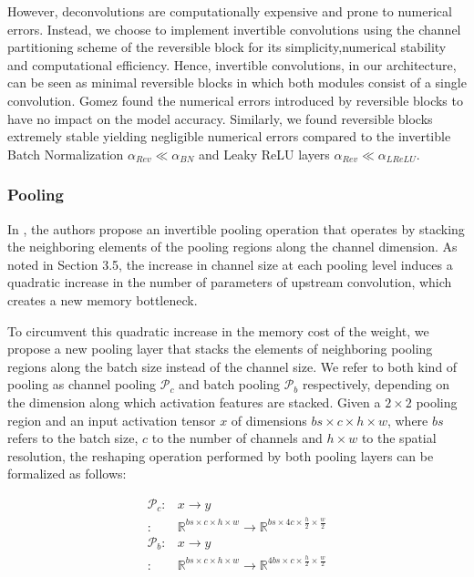 \documentclass[twocolumn]{bmcart}
\begin{document}
However, deconvolutions are computationally expensive and prone to numerical errors.
Instead, we choose to implement invertible convolutions using the channel partitioning scheme
of the reversible block for its simplicity,numerical stability and computational efficiency.
Hence, invertible convolutions, in our architecture, can be seen as minimal reversible blocks
in which both modules consist of a single convolution.
Gomez \etal \cite{gomez2017reversible} found the numerical errors introduced by reversible blocks to have no impact on the model accuracy.
Similarly, we found reversible blocks extremely stable yielding negligible numerical errors
compared to the invertible Batch Normalization $\alpha_{Rev} \ll \alpha_{BN}$
and Leaky ReLU layers $\alpha_{Rev} \ll \alpha_{LReLU}$.

\subsubsection{Pooling}

In \cite{jacobsen2018revnet}, the authors propose an invertible pooling operation that operates
by stacking the neighboring elements of the pooling regions along the channel dimension.
As noted in Section 3.5, the increase in channel size at each pooling level
induces a quadratic increase in the number of parameters of upstream convolution,
which creates a new memory bottleneck.

To circumvent this quadratic increase in the memory cost of the weight,
we propose a new pooling layer that stacks the elements of neighboring pooling regions along the batch size instead of the channel size.
We refer to both kind of pooling as channel pooling $\mathcal{P}_c$ and batch pooling $\mathcal{P}_b$ respectively,
depending on the dimension along which activation features are stacked.
Given a $2 \times 2$ pooling region and an input activation tensor $x$ of dimensions $bs \times c \times h \times w$,
where $bs$ refers to the batch size, $c$ to the number of channels and $h \times w$ to the spatial resolution,
the reshaping operation performed by both pooling layers can be formalized as follows:

\begin{subequations}
\begin{align}
	\mathcal{P}_c :& x \rightarrow y \\
	              :&  \mathbb{R}^{bs \times c \times h \times w}  \rightarrow \mathbb{R}^{bs \times 4c \times \frac{h}{2} \times \frac{w}{2}}\\
	\mathcal{P}_b :& x \rightarrow y \\
                      :&  \mathbb{R}^{bs \times c \times h \times w}  \rightarrow \mathbb{R}^{4bs \times c \times \frac{h}{2} \times \frac{w}{2}}
\end{align}
\end{subequations}
\end{document}
